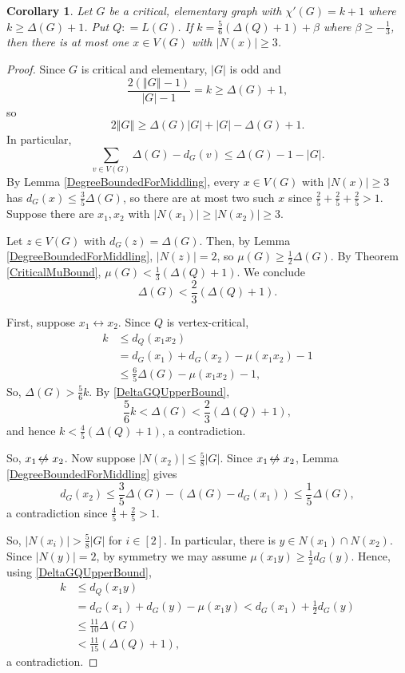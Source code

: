 \documentclass[12pt]{amsart}
\theoremstyle{plain}
\newtheorem{cor}[thm]{Corollary}
\theoremstyle{definition}
\theoremstyle{remark}
\newcommand{\card}[1]{\left|#1\right|}
\newcommand{\size}[1]{\left\Vert#1\right\Vert}
\newcommand{\irange}[1]{\left[#1\right]}
\newcommand{\parens}[1]{\left( #1 \right)}
\newcommand{\DefinedAs}{\mathrel{\mathop:}=}
\def\adj{\leftrightarrow}
\def\nonadj{\not\!\leftrightarrow}
\begin{document}
\begin{cor}\label{CriticalElementary56}
Let $G$ be a critical, elementary graph with $\chi'(G) = k + 1$ where $k \ge \Delta(G) + 1$.  Put $Q \DefinedAs L(G)$. 
If $k = \frac56\parens{\Delta(Q) + 1} + \beta$ where $\beta \ge -\frac13$, then there is at most one $x \in V(G)$ with $\card{N(x)} \ge 3$.
\end{cor}
\begin{proof}
Since $G$ is critical and elementary, $\card{G}$ is odd and
\[\frac{2(\size{G} - 1)}{\card{G} - 1} = k \ge \Delta(G) + 1,\]
so
\[2\size{G} \ge \Delta(G)\card{G} + \card{G} - \Delta(G) + 1.\]
In particular,
\[\sum_{v \in V(G)} \Delta(G) - d_G(v) \le \Delta(G) - 1 - \card{G}.\]
By Lemma \ref{DegreeBoundedForMiddling}, every $x \in V(G)$ with $\card{N(x)} \ge 3$ has $d_G(x) \le \frac35\Delta(G)$, so there are at most two such $x$ since
$\frac25 + \frac25 + \frac25 > 1$.  Suppose there are $x_1, x_2$ with $\card{N(x_1)} \ge \card{N(x_2)} \ge 3$.

Let $z \in V(G)$ with $d_G(z) = \Delta(G)$.  Then, by Lemma \ref{DegreeBoundedForMiddling}, $\card{N(z)} = 2$, so $\mu(G) \ge \frac12\Delta(G)$.
By Theorem \ref{CriticalMuBound}, $\mu(G) < \frac13(\Delta(Q) + 1)$.  We conclude
\begin{equation}
\Delta(G) < \frac23(\Delta(Q) + 1).\label{DeltaGQUpperBound}
\end{equation}

First, suppose $x_1 \adj x_2$.  Since $Q$ is vertex-critical, 
\begin{align*}
k &\le d_Q(x_1x_2)\\
&=d_G(x_1) + d_G(x_2) - \mu(x_1x_2) - 1\\
&\le \frac65\Delta(G) - \mu(x_1x_2) - 1,
\end{align*}
So, $\Delta(G) >\frac56k$.  By \eqref{DeltaGQUpperBound},
\[\frac56k < \Delta(G) < \frac23(\Delta(Q) + 1),\]
and hence $k < \frac45(\Delta(Q) + 1)$, a contradiction.  

So, $x_1 \nonadj x_2$. Now suppose $\card{N(x_2)} \le \frac58\card{G}$.  Since $x_1 \nonadj x_2$, Lemma \ref{DegreeBoundedForMiddling} gives
\[d_G(x_2) \le \frac35\Delta(G) - (\Delta(G) - d_G(x_1)) \le \frac15\Delta(G),\]
a contradiction since $\frac45 + \frac25 > 1$. 

So, $\card{N(x_i)} > \frac58\card{G}$ for $i \in \irange{2}$.  In particular, there is $y \in N(x_1) \cap N(x_2)$.  Since $\card{N(y)} = 2$, by symmetry
we may assume $\mu(x_1y) \ge \frac12 d_G(y)$.  Hence, using \eqref{DeltaGQUpperBound},
\begin{align*}
k &\le d_Q(x_1y) \\
&= d_G(x_1) + d_G(y) - \mu(x_1y) < d_G(x_1) + \frac12d_G(y) \\
&\le \frac{11}{10}\Delta(G) \\
&< \frac{11}{15}(\Delta(Q) + 1),
\end{align*}
a contradiction.
\end{proof}
\end{document}
